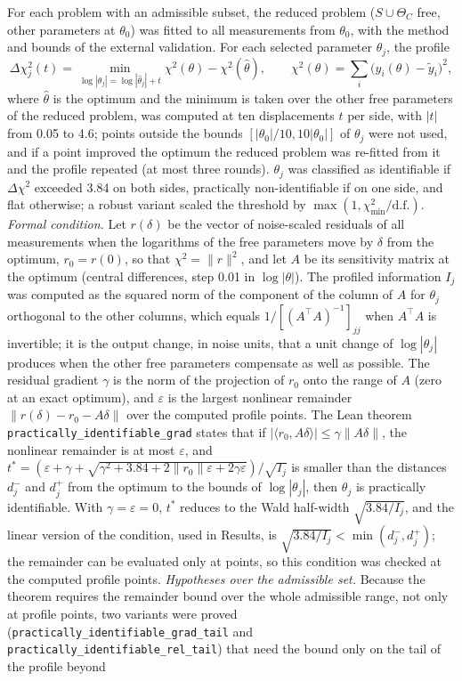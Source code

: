 \documentclass[pdflatex,sn-nature]{sn-jnl}
\theoremstyle{plain}
\begin{document}
For each problem with an admissible subset, the reduced problem ($S\cup\Theta_C$ free, other parameters at $\theta_0$) was fitted to all measurements from $\theta_0$, with the method and bounds of the external validation. For each selected parameter $\theta_j$, the profile
\begin{equation}
\Delta\chi^2_j(t)=\min_{\log|\theta_j|=\log|\hat\theta_j|+t}\chi^2(\theta)-\chi^2(\hat\theta),\qquad \chi^2(\theta)=\sum_i\big(y_i(\theta)-\tilde y_i\big)^2,
\label{eq:profile}
\end{equation}
where $\hat\theta$ is the optimum and the minimum is taken over the other free parameters of the reduced problem, was computed at ten displacements $t$ per side, with $|t|$ from 0.05 to 4.6; points outside the bounds $[|\theta_0|/10,10|\theta_0|]$ of $\theta_j$ were not used, and if a point improved the optimum the reduced problem was re-fitted from it and the profile repeated (at most three rounds). $\theta_j$ was classified as identifiable if $\Delta\chi^2$ exceeded 3.84 on both sides, practically non-identifiable if on one side, and flat otherwise\cite{bib24}; a robust variant scaled the threshold by $\max(1,\chi^2_{\min}/\mathrm{d.f.})$. \label{met:identif-theorem}\emph{Formal condition.} Let $r(\delta)$ be the vector of noise-scaled residuals of all measurements when the logarithms of the free parameters move by $\delta$ from the optimum, $r_0=r(0)$, so that $\chi^2=\|r\|^2$, and let $A$ be its sensitivity matrix at the optimum (central differences, step 0.01 in $\log|\theta|$). The profiled information $I_j$ was computed as the squared norm of the component of the column of $A$ for $\theta_j$ orthogonal to the other columns, which equals $1/[(A^{\top}A)^{-1}]_{jj}$ when $A^{\top}A$ is invertible; it is the output change, in noise units, that a unit change of $\log|\theta_j|$ produces when the other free parameters compensate as well as possible. The residual gradient $\gamma$ is the norm of the projection of $r_0$ onto the range of $A$ (zero at an exact optimum), and $\varepsilon$ is the largest nonlinear remainder $\|r(\delta)-r_0-A\delta\|$ over the computed profile points. The Lean theorem \texttt{practically\_identifiable\_grad} states that if $|\langle r_0,A\delta\rangle|\le\gamma\|A\delta\|$, the nonlinear remainder is at most $\varepsilon$, and $t^{\ast}=(\varepsilon+\gamma+\sqrt{\gamma^2+3.84+2\|r_0\|\varepsilon+2\gamma\varepsilon})/\sqrt{I_j}$ is smaller than the distances $d_j^-$ and $d_j^+$ from the optimum to the bounds of $\log|\theta_j|$, then $\theta_j$ is practically identifiable. With $\gamma=\varepsilon=0$, $t^\ast$ reduces to the Wald half-width $\sqrt{3.84/I_j}$, and the linear version of the condition, used in Results, is $\sqrt{3.84/I_j}<\min(d_j^-,d_j^+)$; the remainder can be evaluated only at points, so this condition was checked at the computed profile points. \label{met:identif-region}\emph{Hypotheses over the admissible set.} Because the theorem requires the remainder bound over the whole admissible range, not only at profile points, two variants were proved (\texttt{practically\_identifiable\_grad\_tail} and \texttt{practically\_identifiable\_rel\_tail}) that need the bound only on the tail of the profile beyond 
\end{document}
